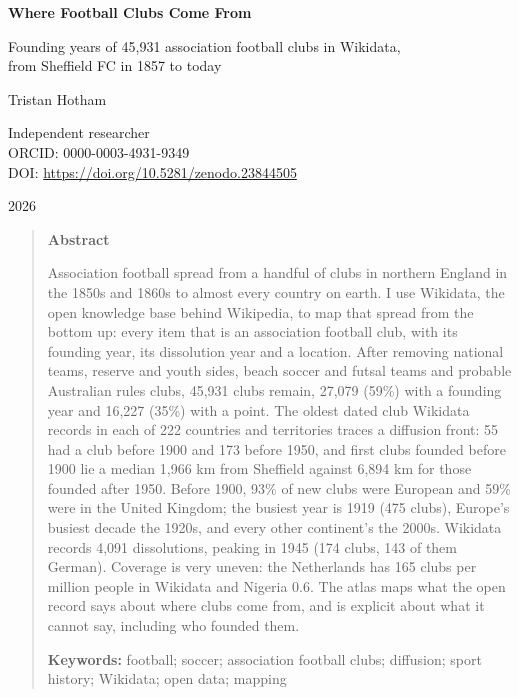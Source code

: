 \documentclass[11pt,a4paper]{article}
\begin{document}
\begin{center}
{\Large\bfseries Where Football Clubs Come From\par}
\vspace{0.4em}
{\large Founding years of 45,931 association football clubs in Wikidata,\\from Sheffield FC in 1857 to today\par}
\vspace{1.2em}
{\large Tristan Hotham\par}
\vspace{0.3em}
{\small Independent researcher\\
ORCID: 0000-0003-4931-9349\\
DOI: \href{https://doi.org/10.5281/zenodo.23844505}{https://doi.org/10.5281/zenodo.23844505}\par}
\vspace{0.8em}
2026
\end{center}

\begin{quote}
\small
\begin{center}\textbf{Abstract}\end{center}
Association football spread from a handful of clubs in northern England in the 1850s and 1860s to almost every country on earth. I use Wikidata, the open knowledge base behind Wikipedia, to map that spread from the bottom up: every item that is an association football club, with its founding year, its dissolution year and a location. After removing national teams, reserve and youth sides, beach soccer and futsal teams and probable Australian rules clubs, 45,931 clubs remain, 27,079 (59\%) with a founding year and 16,227 (35\%) with a point. The oldest dated club Wikidata records in each of 222 countries and territories traces a diffusion front: 55 had a club before 1900 and 173 before 1950, and first clubs founded before 1900 lie a median 1,966 km from Sheffield against 6,894 km for those founded after 1950. Before 1900, 93\% of new clubs were European and 59\% were in the United Kingdom; the busiest year is 1919 (475 clubs), Europe's busiest decade the 1920s, and every other continent's the 2000s. Wikidata records 4,091 dissolutions, peaking in 1945 (174 clubs, 143 of them German). Coverage is very uneven: the Netherlands has 165 clubs per million people in Wikidata and Nigeria 0.6. The atlas maps what the open record says about where clubs come from, and is explicit about what it cannot say, including who founded them.

\textbf{Keywords:} football; soccer; association football clubs; diffusion; sport history; Wikidata; open data; mapping
\end{quote}
\end{document}
